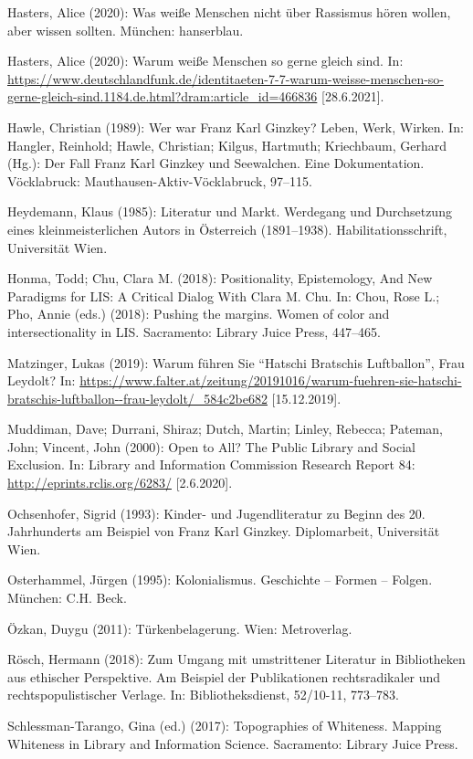 \documentclass[a4paper,
fontsize=11pt,
oneside,
numbers=noperiodatend,
parskip=half-,
bibliography=totoc,
final
]{scrartcl}
\begin{document}
{Hasters, Alice (2020): Was weiße Menschen nicht über Rassismus hören
wollen, aber wissen sollten. München: hanserblau.

Hasters, Alice (2020): Warum weiße Menschen so gerne gleich sind. In:
\url{https://www.deutschlandfunk.de/identitaeten-7-7-warum-weisse-menschen-so-gerne-gleich-sind.1184.de.html?dram:article_id=466836}
[28.6.2021].

Hawle, Christian (1989): Wer war Franz Karl Ginzkey? Leben, Werk,
Wirken. In: Hangler, Reinhold; Hawle, Christian; Kilgus, Hartmuth;
Kriechbaum, Gerhard (Hg.): Der Fall Franz Karl Ginzkey und Seewalchen.
Eine Dokumentation. Vöcklabruck: Mauthausen-Aktiv-Vöcklabruck, 97--115.

Heydemann, Klaus (1985): Literatur und Markt. Werdegang und Durchsetzung
eines kleinmeisterlichen Autors in Österreich (1891--1938).
Habilitationsschrift, Universität Wien.

Honma, Todd; Chu, Clara M. (2018): Positionality, Epistemology, And New
Paradigms for LIS: A Critical Dialog With Clara M. Chu. In: Chou, Rose
L.; Pho, Annie (eds.) (2018): Pushing the margins. Women of color and
intersectionality in LIS. Sacramento: Library Juice Press, 447--465.

Matzinger, Lukas (2019): Warum führen Sie \enquote{Hatschi Bratschis
Luftballon}, Frau Leydolt? In:
\url{https://www.falter.at/zeitung/20191016/warum-fuehren-sie-hatschi-bratschis-luftballon--frau-leydolt/_584c2be682}
[15.12.2019].

Muddiman, Dave; Durrani, Shiraz; Dutch, Martin; Linley, Rebecca;
Pateman, John; Vincent, John (2000): Open to All? The Public Library and
Social Exclusion. In: Library and Information Commission Research Report
84: \url{http://eprints.rclis.org/6283/} [2.6.2020].

Ochsenhofer, Sigrid (1993): Kinder- und Jugendliteratur zu Beginn des
20. Jahrhunderts am Beispiel von Franz Karl Ginzkey. Diplomarbeit,
Universität Wien.

Osterhammel, Jürgen (1995): Kolonialismus. Geschichte -- Formen --
Folgen. München: C.H. Beck.

Özkan, Duygu (2011): Türkenbelagerung. Wien: Metroverlag.

Rösch, Hermann (2018): Zum Umgang mit umstrittener Literatur in
Bibliotheken aus ethischer Perspektive. Am Beispiel der Publikationen
rechtsradikaler und rechtspopulistischer Verlage. In: Bibliotheksdienst,
52/10-11, 773--783.

Schlessman-Tarango, Gina (ed.) (2017): Topographies of Whiteness.
Mapping Whiteness in Library and Information Science. Sacramento:
Library Juice Press.

}
\end{document}
